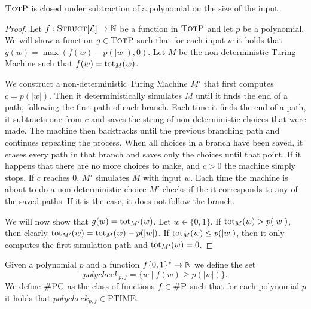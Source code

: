 \begin{theo}
	$\textsc{TotP}$ is closed under subtraction of a polynomial on the size of the input.
\end{theo}
\begin{proof}
	Let $f:\textsc{Struct}[{\cal L}]\to\mathbb{N}$ be a function in $\textsc{TotP}$ and let $p$ be a polynomial. We will show a function $g\in\textsc{TotP}$ such that for each input $w$ it holds that $g(w) = \max(f(w) - p(\vert w \vert),0)$. Let $M$ be the non-deterministic Turing Machine such that $f(w) = \text{tot}_M(w)$. 
	
	We construct a non-deterministic Turing Machine $M'$ that first computes $c = p(\vert w \vert)$. Then it deterministically simulates $M$ until it finds the end of a path, following the first path of each branch. Each time it finds the end of a path, it subtracts one from $c$ and saves the string of non-deterministic choices that were made. The machine then backtracks until the previous branching path and continues repeating the process. When all choices in a branch have been saved, it erases every path in that branch and saves only the choices until that point. If it happens that there are no more choices to make, and $c > 0$ the machine simply stops. If $c$ reaches 0, $M'$ simulates $M$ with input $w$. Each time the machine is about to do a non-deterministic choice $M'$ checks if the it corresponds to any of the saved paths. If it is the case, it does not follow the branch.
	
	We will now show that $g(w) = \text{tot}_{M'}(w)$. Let $w\in\{0,1\}$. If $\text{tot}_{M}(w) > p(\vert w \vert)$, then clearly $\text{tot}_{M'}(w) = \text{tot}_{M}(w) - p(\vert w \vert)$. If $\text{tot}_{M}(w) \leq p(\vert w \vert)$, then it only computes the first simulation path and $\text{tot}_{M'}(w) = 0$.
\end{proof}

Given a polynomial $p$ and a function $f\{0,1\}^*\to\mathbb{N}$ we define the set
\[
	polycheck_{p,f} = \{w\mid f(w) \geq p(\vert w \vert) \}.
\]
We define $\textsc{\#PC}$ as the class of functions $f\in\textsc{\#P}$ such that for each polynomial $p$ it holds that $polycheck_{p,f}\in \text{PTIME}$.